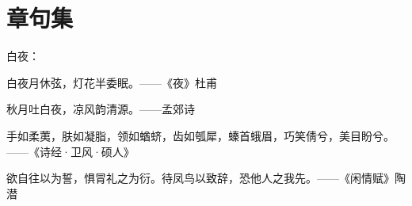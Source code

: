 \section{章句集}

白夜：

白夜月休弦，灯花半委眠。——《夜》杜甫

秋月吐白夜，凉风韵清源。——孟郊诗

\vspace*{2\ccwd}

手如柔荑，肤如凝脂，领如蝤蛴，齿如瓠犀，螓首蛾眉，巧笑倩兮，美目盼兮。——《诗经·卫风·硕人》

\vspace*{2\ccwd}

欲自往以为誓，惧冐礼之为衍。待凤鸟以致辞，恐他人之我先。——《闲情赋》陶潜



\newpage